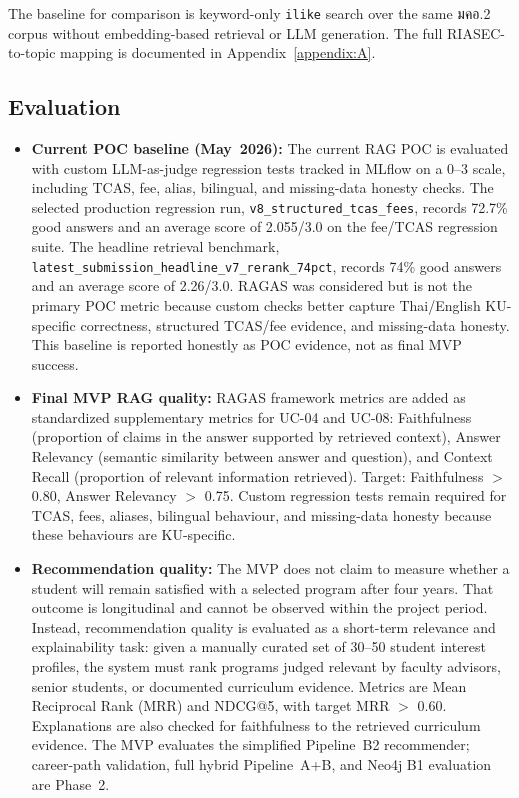 The baseline for comparison is keyword-only \texttt{ilike} search over the same มคอ.2 corpus without embedding-based retrieval or LLM generation. The full RIASEC-to-topic mapping is documented in Appendix~\ref{appendix:A}.

\subsection{Evaluation}
\label{subsection:evaluation}

\begin{itemize}[leftmargin=80pt]
    \item \textbf{Current POC baseline (May~2026):} The current RAG POC is evaluated with custom LLM-as-judge regression tests tracked in MLflow on a 0--3 scale, including TCAS, fee, alias, bilingual, and missing-data honesty checks. The selected production regression run, \texttt{v8\_structured\_tcas\_fees}, records 72.7\% good answers and an average score of 2.055/3.0 on the fee/TCAS regression suite. The headline retrieval benchmark, \texttt{latest\_submission\_headline\_v7\_rerank\_74pct}, records 74\% good answers and an average score of 2.26/3.0. RAGAS was considered but is not the primary POC metric because custom checks better capture Thai/English KU-specific correctness, structured TCAS/fee evidence, and missing-data honesty. This baseline is reported honestly as POC evidence, not as final MVP success.

    \item \textbf{Final MVP RAG quality:} RAGAS framework metrics \cite{es2023ragas} are added as standardized supplementary metrics for UC-04 and UC-08: Faithfulness (proportion of claims in the answer supported by retrieved context), Answer Relevancy (semantic similarity between answer and question), and Context Recall (proportion of relevant information retrieved). Target: Faithfulness $>$ 0.80, Answer Relevancy $>$ 0.75. Custom regression tests remain required for TCAS, fees, aliases, bilingual behaviour, and missing-data honesty because these behaviours are KU-specific.

    \item \textbf{Recommendation quality:} The MVP does not claim to measure whether a student will remain satisfied with a selected program after four years. That outcome is longitudinal and cannot be observed within the project period. Instead, recommendation quality is evaluated as a short-term relevance and explainability task: given a manually curated set of 30--50 student interest profiles, the system must rank programs judged relevant by faculty advisors, senior students, or documented curriculum evidence. Metrics are Mean Reciprocal Rank (MRR) and NDCG@5, with target MRR $>$ 0.60. Explanations are also checked for faithfulness to the retrieved curriculum evidence. The MVP evaluates the simplified Pipeline~B2 recommender; career-path validation, full hybrid Pipeline~A+B, and Neo4j B1 evaluation are Phase~2.


\end{itemize}
